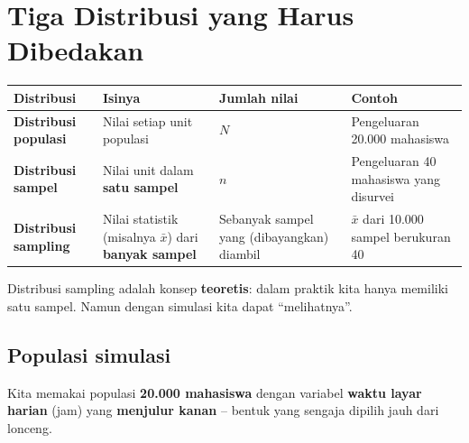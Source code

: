 \documentclass[
  indonesian,
  letterpaper,
]{book}
\newcounter{none} %
\begin{document}
\chapter{Tiga Distribusi yang Harus
Dibedakan}\label{tiga-distribusi-yang-harus-dibedakan}

{\def\LTcaptype{none} %
\begin{longtable}[]{@{}
  >{\raggedright\arraybackslash}p{}
  >{\raggedright\arraybackslash}p{}
  >{\raggedright\arraybackslash}p{}
  >{\raggedright\arraybackslash}p{}@{}}
\toprule\noalign{}
\begin{minipage}[b]{\linewidth}\raggedright
Distribusi
\end{minipage} & \begin{minipage}[b]{\linewidth}\raggedright
Isinya
\end{minipage} & \begin{minipage}[b]{\linewidth}\raggedright
Jumlah nilai
\end{minipage} & \begin{minipage}[b]{\linewidth}\raggedright
Contoh
\end{minipage} \\
\midrule\noalign{}
\endhead
\bottomrule\noalign{}
\endlastfoot
\textbf{Distribusi populasi} & Nilai setiap unit populasi & \(N\) &
Pengeluaran 20.000 mahasiswa \\
\textbf{Distribusi sampel} & Nilai unit dalam \textbf{satu sampel} &
\(n\) & Pengeluaran 40 mahasiswa yang disurvei \\
\textbf{Distribusi sampling} & Nilai statistik (misalnya \(\bar{x}\))
dari \textbf{banyak sampel} & Sebanyak sampel yang (dibayangkan) diambil
& \(\bar{x}\) dari 10.000 sampel berukuran 40 \\
\end{longtable}
}

Distribusi sampling adalah konsep \textbf{teoretis}: dalam praktik kita
hanya memiliki satu sampel. Namun dengan simulasi kita dapat
``melihatnya''.

\section{Populasi simulasi}\label{populasi-simulasi}

Kita memakai populasi \textbf{20.000 mahasiswa} dengan variabel
\textbf{waktu layar harian} (jam) yang \textbf{menjulur kanan} -- bentuk
yang sengaja dipilih jauh dari lonceng.
\end{document}
